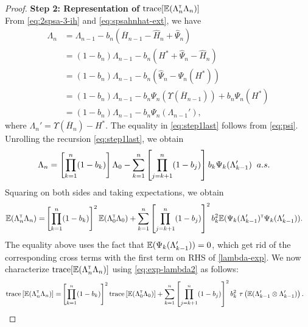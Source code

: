 \begin{proof}
\noindent\textbf{Step 2: Representation of $\text{trace}[\mathbb{E} (\Lambda_n ^\mathsf{\scriptscriptstyle T} \Lambda_n)]$} \\
 From \eqref{eq:2spsa-3-ih} and \eqref{eq:spsahnhat-ext},  we have
 \begin{align}
 \Lambda_n &= \Lambda_{n-1} - b_n ( \overline H_{n-1} - \hat H_n + \hat \Psi_n) \nonumber\\
&= (1-b_n) \Lambda_{n-1} - b_n (H^* + \hat \Psi_n - \hat H_n ) \nonumber\\&= (1-b_n) \Lambda_{n-1} - b_n (\hat \Psi_n - \Psi_n(H^*)) \nonumber\\&= (1-b_n) \Lambda_{n-1} - b_n \Psi_n(\Upsilon(\overline H_{n-1})) + b_n \Psi_n(H^*) \nonumber\\
&= (1-b_n) \Lambda_{n-1} - b_n\Psi_n(\Lambda_{n-1}'),\label{eq:step1last}
 \end{align}
where $\Lambda_n' = \Upsilon(\overline H_n) - H^*$.
The equality in \eqref{eq:step1last} follows from \eqref{eq:psi}. 
Unrolling the recursion \eqref{eq:step1last}, we obtain 
 \begin{align}\label{lambda-exp}
  \Lambda_n  = \left[ \prod_{k=1}^n (1-b_k) \right]\Lambda_0 
&- \sum_{k=1}^n \left[\prod_{j=k+1}^n (1-b_j)\right] b_k \Psi_k(\Lambda_{k-1}')  \hspace{0.2cm} a.s.
 \end{align}
Squaring on both sides and taking expectations, we obtain
 \begin{align}
  \mathbb{E} (\Lambda_n ^\mathsf{\scriptscriptstyle T} \Lambda_n) =  &\left[ \prod_{k=1}^n (1-b_k) \right]^2 \mathbb{E} (\Lambda_0 ^\mathsf{\scriptscriptstyle T} \Lambda_0) + \sum_{k=1}^n \left[\prod_{j=k+1}^n (1-b_j)\right]^2 b_k^2   \mathbb{E} (\Psi_k(\Lambda_{k-1}') ^\mathsf{\scriptscriptstyle T} \Psi_k(\Lambda_{k-1}')).\label{eq:exp-lambda2}
 \end{align}
The equality above uses the fact that $\mathbb{E}(\Psi_k(\Lambda_{k-1}'))=0$, which get rid of the corresponding cross terms with the first term on RHS of \eqref{lambda-exp}. %
We now characterize $\text{trace}[\mathbb{E}(\Lambda_n^\mathsf{\scriptscriptstyle T} \Lambda_n)]$ using \eqref{eq:exp-lambda2} as follows:
 \begin{align}\label{eq:trace}
 \text{trace} \left[\E (\Lambda_n \tr \Lambda_n)\right] = &\left[ \prod_{k=1}^n (1-b_k) \right]^2 \text{trace} \left[\E (\Lambda_0 \tr \Lambda_0)\right]  + \sum_{k=1}^n \left[\prod_{j=k+1}^n (1-b_j)\right]^2 b_k^2  \,\,\tau\left(\E (\Lambda_{k-1}' \otimes \Lambda_{k-1}')\right).

\end{align}
\end{proof}
